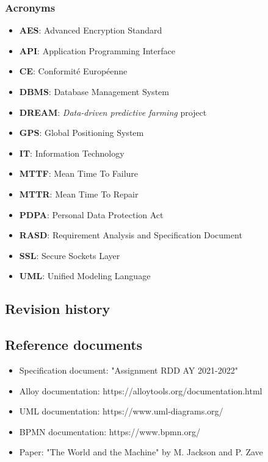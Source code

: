\documentclass[table, 12pt]{article}
\begin{document}
\subsubsection*{Acronyms}
\begin{itemize}
    \item \textbf{AES}: Advanced Encryption Standard
    \item \textbf{API}: Application Programming Interface
    \item \textbf{CE}: Conformité Européenne
    \item \textbf{DBMS}: Database Management System
    \item \textbf{DREAM}: \emph{Data-driven predictive farming} project
    \item \textbf{GPS}: Global Positioning System
    \item \textbf{IT}: Information Technology
    \item \textbf{MTTF}: Mean Time To Failure
    \item \textbf{MTTR}: Mean Time To Repair
    \item \textbf{PDPA}: Personal Data Protection Act 
    \item \textbf{RASD}: Requirement Analysis and Specification Document
    \item \textbf{SSL}: Secure Sockets Layer
    \item \textbf{UML}: Unified Modeling Language
\end{itemize}
\subsection{Revision history}
\subsection{Reference documents}
\begin{itemize}
    \item Specification document: "Assignment RDD AY 2021-2022"
    \item Alloy documentation: https://alloytools.org/documentation.html
    \item UML documentation: https://www.uml-diagrams.org/
    \item BPMN documentation: https://www.bpmn.org/
    \item Paper: "The World and the Machine" by M. Jackson and P. Zave
\end{itemize}
\end{document}
